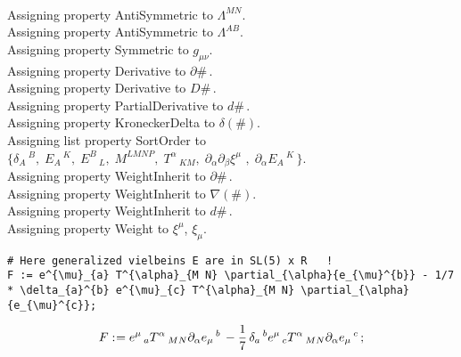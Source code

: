 \documentclass[11pt]{article}
\def\specialcolon{\mathrel{\mathop{:}}\hspace{-.5em}}
\begin{document}
\\
Assigning property AntiSymmetric to ${\Lambda}^{M N}$.
\\
Assigning property AntiSymmetric to ${\Lambda}^{A B}$.
\\
Assigning property Symmetric to ${g}_{\mu \nu}$.
\\
Assigning property Derivative to $\partial{\#}\, $.
\\
Assigning property Derivative to $D{\#}\, $.
\\
Assigning property PartialDerivative to $d{\#}\, $.
\\
Assigning property KroneckerDelta to $\delta(\#)$.
\\
Assigning list property SortOrder to $\{{\delta}_{A}\,^{B},\; {E}_{A}\,^{K},\; {E}^{B}\,_{L},\; {M}^{L M N P},\; {T}^{\alpha}\,_{K M},\; {\partial}_{\alpha}{{\partial}_{\beta}{{\xi}^{\mu}}\, }\, ,\; {\partial}_{\alpha}{{E}_{A}\,^{K}}\, \}$.
\\
Assigning property WeightInherit to $\partial{\#}\, $.
\\
Assigning property WeightInherit to $\nabla(\#)$.
\\
Assigning property WeightInherit to $d{\#}\, $.
\\
Assigning property Weight to ${\xi}^{\mu}$, ${\xi}_{\mu}$.
\\
{\color[named]{Blue}\begin{verbatim}
# Here generalized vielbeins E are in SL(5) x R   !
F := e^{\mu}_{a} T^{\alpha}_{M N} \partial_{\alpha}{e_{\mu}^{b}} - 1/7 * \delta_{a}^{b} e^{\mu}_{c} T^{\alpha}_{M N} \partial_{\alpha}{e_{\mu}^{c}};
\end{verbatim}}
\begin{dmath*}[compact, spread=2pt]
F\specialcolon{}= {e}^{\mu}\,_{a} {T}^{\alpha}\,_{M N} {\partial}_{\alpha}{{e}_{\mu}\,^{b}}\,  - \frac{1}{7}\, {\delta}_{a}\,^{b} {e}^{\mu}\,_{c} {T}^{\alpha}\,_{M N} {\partial}_{\alpha}{{e}_{\mu}\,^{c}}\, ;
\end{dmath*}
\end{document}
